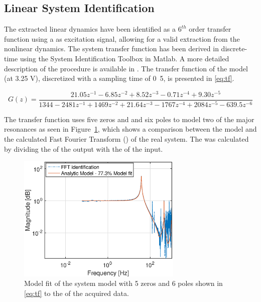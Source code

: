 \subsection{Linear System Identification}
\label{sec:linsys}
The extracted linear dynamics have been identified as a $6^{th}$ order transfer function using a \abbrPRBS as excitation signal, allowing for a valid extraction from the nonlinear dynamics. The system transfer function has been derived in discrete-time using the System Identification Toolbox in Matlab. A more detailed description of the procedure is available in \citep{ButcherController:2015}. The transfer function of the model (at 3.25 V), discretized with a sampling time of \unit{0.5}{\milli\second}, is presented in \eqref{eq:tf}.

\begin{equation}
  \label{eq:tf}
  G(z) = \frac{21.05z^{-1} - 6.85z^{-2} + 8.52z^{-3} - 0.71z^{-4} + 9.30z^{-5}}{1344 - 2481z^{-1} + 1469z^{-2} + 21.64z^{-3} - 1767z^{-4} + 2084z^{-5} - 639.5z^{-6}}
\end{equation}

The transfer function uses five zeros and and six poles to model two of the major resonances as seen in Figure~\ref{fig:model}, which shows a comparison between the model and the calculated Fast Fourier Transform (\abbrFFT) of the real system. The \abbrFFT was calculated by dividing the \abbrFFT of the output with the \abbrFFT of the input.

\begin{figure}[h!]
  \centering
  \includegraphics[width=0.7\textwidth]{fig/matlab/model.eps}
  \caption{\label{fig:model} Model fit of the system model with 5 zeros and 6 poles shown in \eqref{eq:tf} to the \abbrFFT of the acquired data.}
\end{figure}

\FloatBarrier
